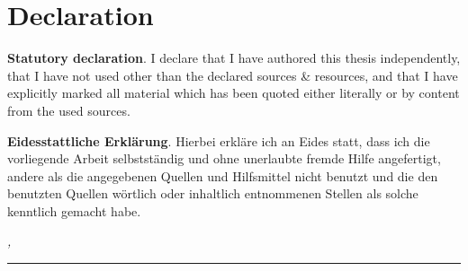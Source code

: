 %
\chapter*{Declaration}
\label{sec:declaration}
\thispagestyle{empty}

\textbf{Statutory declaration}. I declare that I have authored this thesis independently, that I have not used other than the declared sources \& resources, and that I have explicitly marked all material which has been quoted either literally or by content from the used sources. 

\textbf{Eidesstattliche Erklärung}. Hierbei erkl\"are ich an Eides statt, dass ich die vorliegende Arbeit selbstst\"andig und ohne
unerlaubte fremde Hilfe angefertigt, andere als die angegebenen Quellen und Hilfsmittel
nicht benutzt und die den benutzten Quellen w\"ortlich oder inhaltlich entnommenen Stellen
als solche kenntlich gemacht habe.

\bigskip

\noindent\textit{\thesisUniversityCity, \thesisDate}

\smallskip

\begin{flushright}
	\begin{minipage}{5cm}
		\rule{\textwidth}{1pt}
		\centering\thesisName
	\end{minipage}
\end{flushright}

